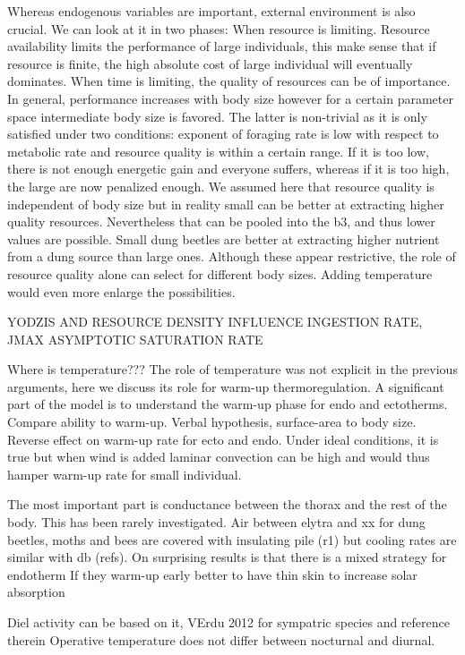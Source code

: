 Whereas endogenous variables are important, external environment is also crucial.
We can look at it in two phases:
When resource is limiting.
Resource availability limits the performance of large individuals, this make sense that if resource is finite, the high absolute cost of large individual will eventually dominates.
When time is limiting, the quality of resources can be of importance.
In general, performance increases with body size however for a certain parameter space intermediate body size is favored.
The latter is non-trivial as it is only satisfied under two conditions: exponent of foraging rate is low with respect to metabolic rate and resource quality is within a certain range.
If it is too low, there is not enough energetic gain and everyone suffers, whereas if it is too high, the large are now penalized enough.
We assumed here that resource quality is  independent of body size but in reality small can be better at extracting higher quality resources.
Nevertheless that can be pooled into the b3, and thus lower values are possible.
Small dung beetles are better at extracting higher nutrient from a dung source than large ones.
Although these appear restrictive, the role of resource quality alone can select for different body sizes.
Adding temperature would even more enlarge the possibilities.

YODZIS AND RESOURCE DENSITY INFLUENCE INGESTION RATE,
JMAX ASYMPTOTIC SATURATION RATE

Where is temperature???
The role of temperature was not explicit in the previous arguments, here we discuss its role for warm-up thermoregulation.
A significant part of the model is to understand the warm-up phase for endo and ectotherms. 
Compare ability to warm-up.
Verbal hypothesis, surface-area to body size. 
Reverse effect on warm-up rate for ecto and endo.
Under ideal conditions, it is true but when wind is added laminar convection can be high and would thus hamper warm-up rate for small individual. 

The most important part is conductance between the thorax and the rest of the body. 
This has been rarely investigated.
Air between elytra and xx for dung beetles, moths and bees are covered with insulating pile (r1) but cooling rates are similar with db (refs).
On surprising results is that there is a mixed strategy for endotherm
If they warm-up early better to have thin skin to increase solar absorption

Diel activity can be based on it, VErdu 2012 for sympatric species and reference therein
Operative temperature does not differ between nocturnal and diurnal.

